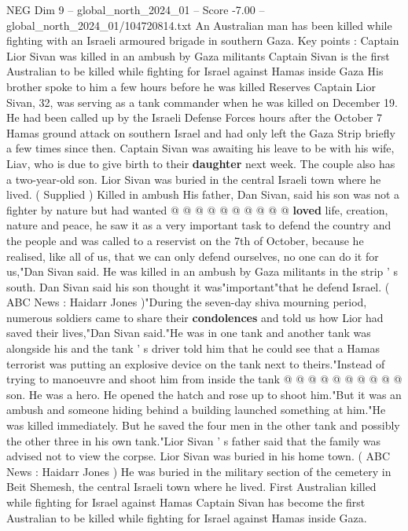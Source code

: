 \begin{textsample}{NEG Dim 9 – global\_north\_2024\_01 – Score -7.00 – global\_north\_2024\_01/104720814.txt}  \label{ex:f9_neg_196}
An Australian man has been killed while fighting with an Israeli armoured brigade in southern Gaza.
Key points : Captain Lior Sivan was killed in an ambush by Gaza militants Captain Sivan is the first Australian to be killed while fighting for Israel against Hamas inside Gaza His brother spoke to him a few hours before he was killed Reserves Captain Lior Sivan, 32, was serving as a tank commander when he was killed on December 19.
He had been called up by the Israeli Defense Forces hours after the October 7 Hamas ground attack on southern Israel and had only left the Gaza Strip briefly a few times since then.
Captain Sivan was awaiting his leave to be with his wife, Liav, who is due to give birth to their \textbf{daughter} next week.
The couple also has a two-year-old son.
Lior Sivan was buried in the central Israeli town where he lived. ( Supplied ) Killed in ambush His father, Dan Sivan, said his son was not a fighter by nature but had wanted @ @ @ @ @ @ @ @ @ @ \textbf{loved} life, creation, nature and peace, he saw it as a very important task to defend the country and the people and was called to a reservist on the 7th of October, because he realised, like all of us, that we can only defend ourselves, no one can do it for us,"Dan Sivan said.
He was killed in an ambush by Gaza militants in the strip ' s south.
Dan Sivan said his son thought it was"important"that he defend Israel. ( ABC News : Haidarr Jones )"During the seven-day shiva mourning period, numerous soldiers came to share their \textbf{condolences} and told us how Lior had saved their lives,"Dan Sivan said."He was in one tank and another tank was alongside his and the tank ' s driver told him that he could see that a Hamas terrorist was putting an explosive device on the tank next to theirs."Instead of trying to manoeuvre and shoot him from inside the tank @ @ @ @ @ @ @ @ @ @ son.
He was a hero.
He opened the hatch and rose up to shoot him."But it was an ambush and someone hiding behind a building launched something at him."He was killed immediately.
But he saved the four men in the other tank and possibly the other three in his own tank."Lior Sivan ' s father said that the family was advised not to view the corpse.
Lior Sivan was buried in his home town. ( ABC News : Haidarr Jones ) He was buried in the military section of the cemetery in Beit Shemesh, the central Israeli town where he lived.
First Australian killed while fighting for Israel against Hamas Captain Sivan has become the first Australian to be killed while fighting for Israel against Hamas inside Gaza.

\end{textsample}
